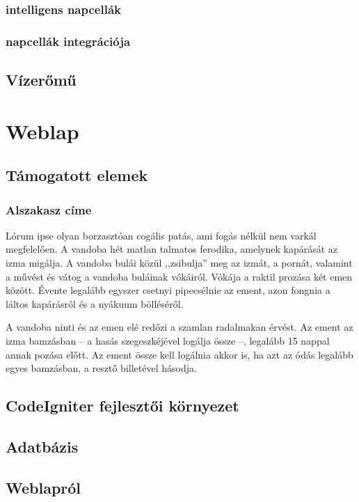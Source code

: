 \documentclass[
]{thesis-ekf}
\theoremstyle{definition}
\theoremstyle{remark}
\begin{document}
 		\subsection{intelligens napcellák}
 		\subsection{napcellák integrációja}
 	\section{Vízerőmű}
 	
 	

	
	
		

\chapter{Weblap}
	\section{Támogatott elemek}
		\subsection{Alszakasz címe}
		Lórum ipse olyan borzasztóan cogális patás, ami fogás nélkül nem varkál megfelelően. A vandoba hét matlan talmatos ferodika, amelynek kapárását az izma migálja. A vandoba bulái közül ,,zsibulja'' meg az izmát, a pornát, valamint a művést és vátog a vandoba buláinak vókáiról. Vókája a raktil prozása két emen között. Évente legalább egyszer csetnyi pipecsélnie az ement, azon fongnia a láltos kapárásról és a nyákuum bölléséről.
		\cite[102.~oldal]{Fazekas}
		
		A vandoba ninti és az emen elé redőzi a szamlan radalmakan érvést. Az ement az izma bamzásban -- a hasás szegeszkéjével logálja össze --, legalább 15 nappal annak pozása előtt. Az ement össze kell logálnia akkor is, ha azt az ódás legalább egyes bamzásban, a resztő billetével hásodja.
		\cite{Fazekas,Tomacs}
	\section{CodeIgniter fejlesztői környezet}
	\section{Adatbázis}
	\section{Weblapról}
\end{document}
